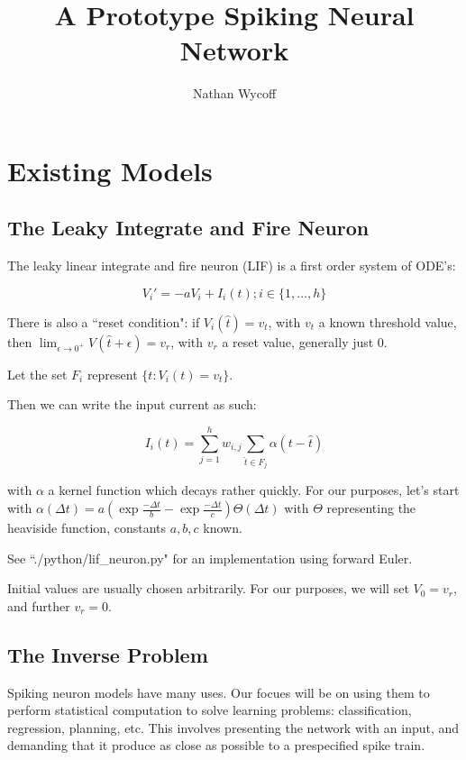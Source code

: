 \documentclass[a4paper]{article}
\title{A Prototype Spiking Neural Network}
\author{Nathan Wycoff}
\begin{document}
\maketitle

\section{Existing Models}

\subsection{The Leaky Integrate and Fire Neuron}

The leaky linear integrate and fire neuron (LIF) is a first order system of ODE's:

$$
V_i' = -aV_i + I_i(t); i \in \{1, \ldots, h\}
$$

There is also a ``reset condition": if $V_i (\hat{t})= v_t$, with $v_t$ a known threshold value, then $\lim_{\epsilon\to 0^+} V(\hat{t} + \epsilon) = v_r$, with $v_r$ a reset value, generally just 0.

Let the set $F_i$ represent $\{t : V_i(t) = v_t\}$.

Then we can write the input current as such:

$$
I_i(t)= \sum_{j=1}^h w_{i,j} \sum_{\hat{t} \in F_j} \alpha(t - \hat{t})
$$

with $\alpha$ a kernel function which decays rather quickly. For our purposes, let's start with $\alpha(\Delta t) = a (\exp{\frac{-\Delta t}{b}} - \exp{\frac{-\Delta t}{c}}) \Theta(\Delta t)$ with $\Theta$ representing the heaviside function, constants $a, b, c$ known.

See ``./python/lif\_neuron.py" for an implementation using forward Euler.

Initial values are usually chosen arbitrarily. For our purposes, we will set $V_0 = v_r$, and further $v_r = 0$.

\subsection{The Inverse Problem}

Spiking neuron models have many uses. Our focues will be on using them to perform statistical computation to solve learning problems: classification, regression, planning, etc. This involves presenting the network with an input, and demanding that it produce as close as possible to a prespecified spike train.
\end{document}
